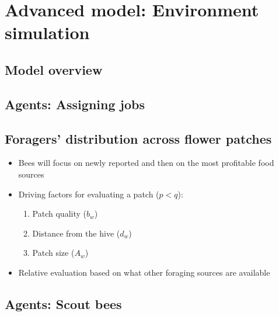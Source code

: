 \documentclass[
	paper=128mm:96mm,
	fontsize=11pt,
	pagesize,
	parskip=half-,
]{scrartcl}
\theoremstyle{mythmstyle} %
\begin{document}
\section{Advanced model: Environment simulation}
	\clearpage
\subsection*{Model overview}
	
	\clearpage
\subsection*{Agents: Assigning jobs}
	
	\clearpage
\subsection*{Foragers' distribution across flower patches}
	\begin{itemize}
		\item Bees will focus on newly reported and then on the most profitable food sources
		\item Driving factors for evaluating a patch ($p < q$):
		\begin{enumerate}
			\item Patch quality ($b_w$)
			\item Distance from the hive ($d_w$)
			\item Patch size ($A_w$)
		\end{enumerate}
		\item Relative evaluation based on what other foraging sources are available
	\end{itemize}
	\clearpage
\subsection*{Agents: Scout bees}
	
	\clearpage
\end{document}
